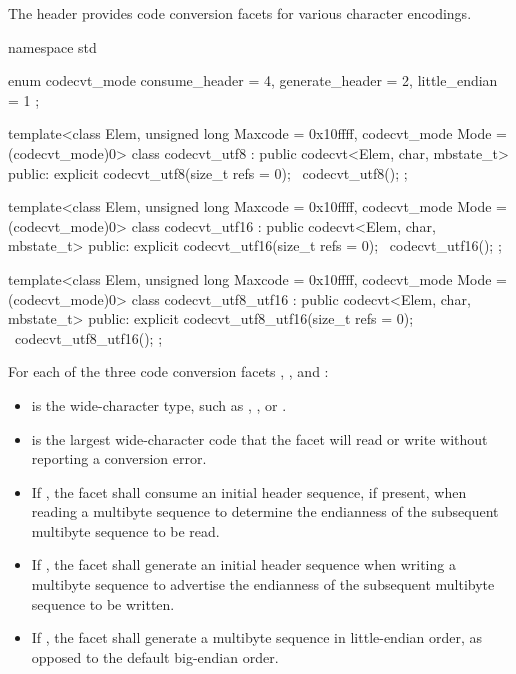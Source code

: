 \pnum
The header  provides code conversion facets for various character encodings.

\pnum
{}

%
\begin{codeblock}
namespace std {
  enum codecvt_mode {
    consume_header = 4,
    generate_header = 2,
    little_endian = 1
  };

  template<class Elem, unsigned long Maxcode = 0x10ffff,
    codecvt_mode Mode = (codecvt_mode)0>
  class codecvt_utf8
    : public codecvt<Elem, char, mbstate_t> {
  public:
    explicit codecvt_utf8(size_t refs = 0);
    ~codecvt_utf8();
  };

  template<class Elem, unsigned long Maxcode = 0x10ffff,
    codecvt_mode Mode = (codecvt_mode)0>
  class codecvt_utf16
    : public codecvt<Elem, char, mbstate_t> {
  public:
    explicit codecvt_utf16(size_t refs = 0);
    ~codecvt_utf16();
  };

  template<class Elem, unsigned long Maxcode = 0x10ffff,
    codecvt_mode Mode = (codecvt_mode)0>
  class codecvt_utf8_utf16
    : public codecvt<Elem, char, mbstate_t> {
  public:
    explicit codecvt_utf8_utf16(size_t refs = 0);
    ~codecvt_utf8_utf16();
  };
}
\end{codeblock}

\pnum
For each of the three code conversion facets , , and :

\begin{itemize}
\item {} is the wide-character type, such as , , or .
\item {} is the largest wide-character code that the facet will read or write without reporting a conversion error.
\item If , the facet shall consume an initial header sequence, if present, when reading a multibyte sequence to determine the endianness of the subsequent multibyte sequence to be read.
\item If , the facet shall generate an initial header sequence when writing a multibyte sequence to advertise the endianness of the subsequent multibyte sequence to be written.
\item If , the facet shall generate a multibyte sequence in little-endian order, as opposed to the default big-endian order.
\end{itemize}

